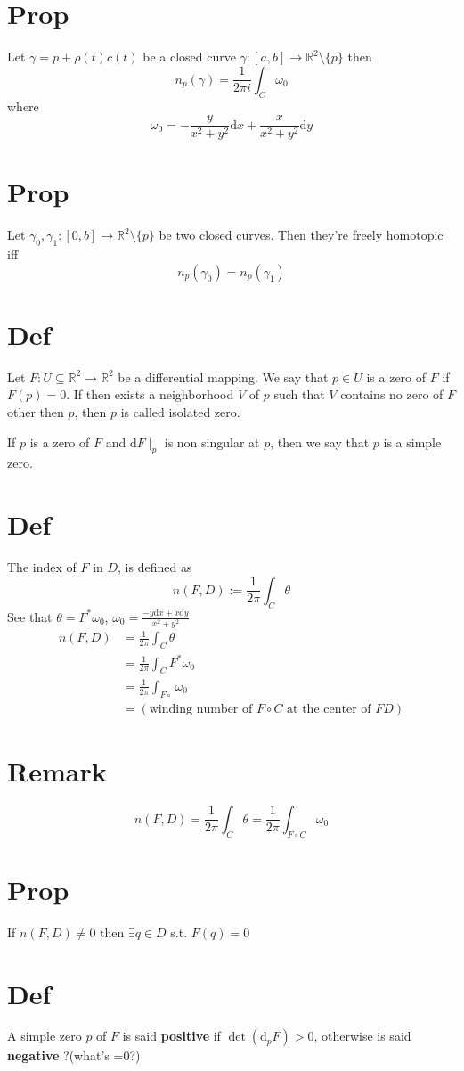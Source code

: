 \documentclass{book}
\begin{document}
\section{Prop}
Let $\gamma=p+\rho(t)c(t)$ be a closed curve $\gamma:[a,b]\rightarrow \mathbb{R}^2\setminus\{p\}$ then
$$n_p(\gamma)=\frac{1}{2\pi i}\int_C\omega_0$$
where $$\omega_0=-\frac{y}{x^2+y^2}\text{d} x+\frac{x}{x^2+y^2}\text{d}y$$
\section{Prop}
Let $\gamma_0,\gamma_1:[0,b]\rightarrow\mathbb{R}^2\setminus\{p\}$ be two closed curves. Then they're freely homotopic iff$$n_p(\gamma_0)=n_p(\gamma_1)$$
\section{Def}
Let $F:U\subseteq \mathbb{R}^2\rightarrow\mathbb{R}^2$ be a differential mapping. We say that $p\in U$ is a zero of $F$ if $F(p)=0$. If then exists a neighborhood $V$ of $p$ such that $V$ contains no zero of $F$ other then $p$,  then $p$ is called isolated zero.

If $p$ is a zero of $F$ and $\text{d}F\mid_p$ is non singular at $p$, then we say that $p$ is a simple zero.
\section{Def} The index of $F$ in $D$, is defined as
$$n(F,D):=\frac{1}{2\pi}\int_C\theta$$
See that $\theta=F^*\omega_0$, $\omega_0=\frac{-y\text{d}x+x\text{d}y}{x^2+y^2}$
$$\begin{aligned}
    n(F,D)&=\frac{1}{2\pi}\int_C\theta\\
    &=\frac{1}{2\pi}\int_CF^*\omega_0\\
    &=\frac{1}{2\pi}\int_{F\circ}\omega_0\\
    &=(\text{winding number of }F\circ C\text{ at the center of }F D)
\end{aligned}$$ 
\section{Remark}
$$n(F,D)=\frac{1}{2\pi}\int_C\theta=\frac{1}{2\pi}\int_{F\circ C}\omega_0$$
\section{Prop}
If $n(F,D)\neq 0$ then $\exists q\in D$ s.t. $F(q)=0$
\section{Def}
A simple zero $p$ of $F$ is said \textbf{positive} if $\det(\text{d}_p F)>0$, otherwise is said \textbf{negative} ?(what's =0?)
\end{document}
